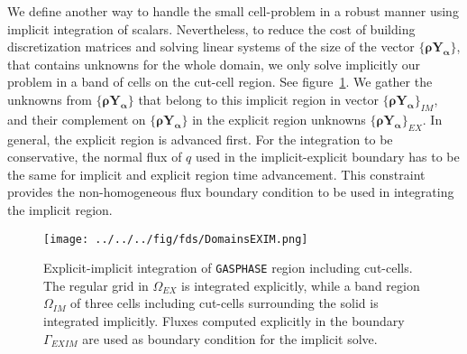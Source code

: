 \documentclass[12pt]{article}
\begin{document}
We define another way to handle the small cell-problem in a robust manner using implicit integration of scalars. Nevertheless, to reduce the cost of building discretization matrices and solving linear systems of the size of the vector $\{\mathbf{\rho Y_\alpha}\}$, that contains unknowns for the whole domain, we only solve implicitly our problem in a band of cells on the cut-cell region. See figure~\ref{Fig:DOMEXIM}. We gather the unknowns from  $\{\mathbf{\rho Y_\alpha}\}$ that belong to this implicit region in vector $\{\mathbf{\rho Y_\alpha}\}_{IM}$, and their complement on $\{\mathbf{\rho Y_\alpha}\}$ in the explicit region unknowns $\{\mathbf{\rho Y_\alpha}\}_{EX}$. In general, the explicit region is advanced first. For the integration to be conservative, the normal flux of $q$ used in the implicit-explicit boundary has to be the same for implicit and explicit region time advancement. This constraint provides the non-homogeneous flux boundary condition to be used in integrating the implicit region.

%
\begin{figure}[h]
      \centering
      \texttt{[image: ../../../fig/fds/DomainsEXIM.png]}
      \caption{Explicit-implicit integration of \texttt{GASPHASE} region including cut-cells. The regular grid in $\Omega_{EX}$ is integrated explicitly, while a band region $\Omega_{IM}$ of three cells including cut-cells surrounding the solid is integrated implicitly. Fluxes computed explicitly in the boundary $\Gamma_{EXIM}$ are used as boundary condition for the implicit solve.}
	\label{Fig:DOMEXIM}
\end{figure}
%
\end{document}
